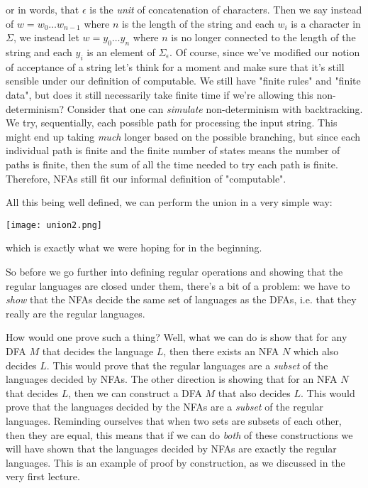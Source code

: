 \documentclass[11pt]{article}
\begin{document}
or in words, that $\epsilon$ is the \emph{unit} of concatenation of characters. Then we say instead of $w = w_0 \ldots w_{n-1}$ where $n$ is the length of the string and each $w_i$ is a character in $\Sigma$, we instead let $w = y_0 \ldots y_n$ where $n$ is no longer connected to the length of the string and each $y_i$ is an element of $\Sigma_{\epsilon}$. Of course, since we've modified our notion of acceptance of a string let's think for a moment and make sure that it's still sensible under our definition of computable. We still have "finite rules" and "finite data", but does it still necessarily take finite time if we're allowing this non-determinism? Consider that one can \emph{simulate} non-determinism with backtracking. We try, sequentially, each possible path for processing the input string. This might end up taking \emph{much} longer based on the possible branching, but since each individual path is finite and the finite number of states means the number of paths is finite, then the sum of all the time needed to try each path is finite. Therefore, NFAs still fit our informal definition of "computable".

All this being well defined, we can perform the union in a very simple way: 

\texttt{[image: union2.png]}

which is exactly what we were hoping for in the beginning.

So before we go further into defining regular operations and showing that the regular languages are closed under them, there's a bit of a problem: we have to \emph{show} that the NFAs decide the same set of languages as the DFAs, i.e. that they really are the regular languages.

How would one prove such a thing? Well, what we can do is show that for any DFA $M$ that decides the language $L$, then there exists an NFA $N$ which also decides $L$. This would prove that the regular languages are a \emph{subset} of the languages decided by NFAs. The other direction is showing that for an NFA $N$ that decides $L$, then we can construct a DFA $M$ that also decides $L$. This would prove that the languages decided by the NFAs are a \emph{subset} of the regular languages. Reminding ourselves that when two sets are subsets of each other, then they are equal, this means that if we can do \emph{both} of these constructions we will have shown that the languages decided by NFAs are exactly the regular languages. This is an example of proof by construction, as we discussed in the very first lecture.
\end{document}
